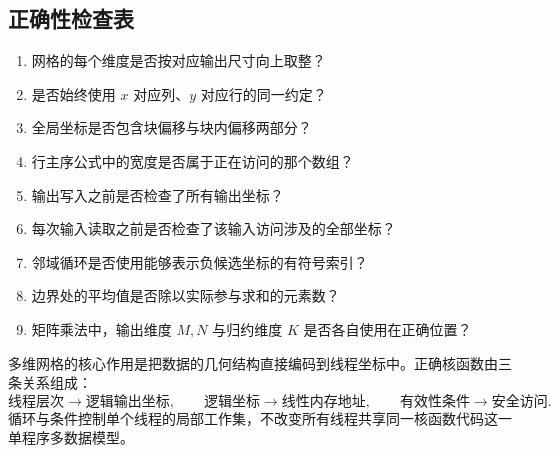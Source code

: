 \subsection{正确性检查表}

\begin{enumerate}
  \item 网格的每个维度是否按对应输出尺寸向上取整？
  \item 是否始终使用 $x$ 对应列、$y$ 对应行的同一约定？
  \item 全局坐标是否包含块偏移与块内偏移两部分？
  \item 行主序公式中的宽度是否属于正在访问的那个数组？
  \item 输出写入之前是否检查了所有输出坐标？
  \item 每次输入读取之前是否检查了该输入访问涉及的全部坐标？
  \item 邻域循环是否使用能够表示负候选坐标的有符号索引？
  \item 边界处的平均值是否除以实际参与求和的元素数？
  \item 矩阵乘法中，输出维度 $M,N$ 与归约维度 $K$ 是否各自使用在正确位置？
\end{enumerate}

\begin{keybox}
多维网格的核心作用是把数据的几何结构直接编码到线程坐标中。正确核函数由三条关系组成：
\[
\text{线程层次}\rightarrow\text{逻辑输出坐标},
\qquad
\text{逻辑坐标}\rightarrow\text{线性内存地址},
\qquad
\text{有效性条件}\rightarrow\text{安全访问}.
\]
循环与条件控制单个线程的局部工作集，不改变所有线程共享同一核函数代码这一单程序多数据模型。
\end{keybox}
